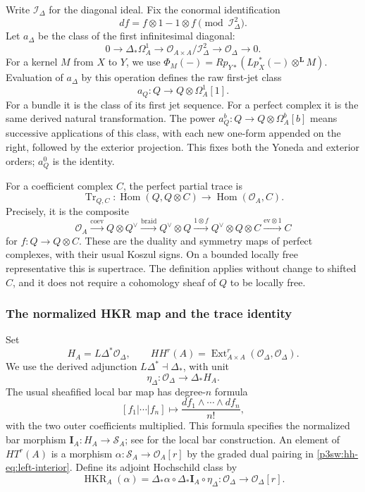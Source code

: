\documentclass[11pt]{article}
\numberwithin{equation}{section}
\begin{document}
Write \(\mathcal I_\Delta\) for the diagonal ideal.  Fix the conormal
identification
\[
 df=f\otimes1-1\otimes f
        \pmod{\mathcal I_\Delta^2}.
\]
Let \(a_\Delta\) be the class of the first infinitesimal diagonal:
\begin{equation}
 0\longrightarrow\Delta_*\Omega_A^1
 \longrightarrow\mathcal O_{A\times A}/\mathcal I_\Delta^2
 \longrightarrow\mathcal O_\Delta\longrightarrow0.
\label{p3sw:hh-eq:jet-extension}
\end{equation}
For a kernel \(M\) from \(X\) to \(Y\), we use
\(\Phi_M(-)=Rp_{Y*}(Lp_X^*(-)\otimes^{\mathbf L}M)\).
Evaluation of \(a_\Delta\) by this operation defines the raw
first-jet class
\[
 a_Q:Q\longrightarrow Q\otimes\Omega_A^1[1].
\]
For a bundle it is the class of its first jet sequence.  For a perfect
complex it is the same derived natural transformation.  The power
\(a_Q^b:Q\to Q\otimes\Omega_A^b[b]\) means successive applications
of this class, with each new one-form appended on the right, followed
by the exterior projection.  This fixes both the Yoneda and exterior
orders; \(a_Q^0\) is the identity.

For a coefficient complex \(C\), the perfect partial trace is
\[
 \operatorname{Tr}_{Q,C}:
 \operatorname{Hom}(Q,Q\otimes C)
       \longrightarrow\operatorname{Hom}(\mathcal O_A,C).
\]
Precisely, it is the composite
\[
 \mathcal O_A\xrightarrow{\mathrm{coev}}Q\otimes Q^\vee
 \xrightarrow{\mathrm{braid}}Q^\vee\otimes Q
 \xrightarrow{1\otimes f}Q^\vee\otimes Q\otimes C
 \xrightarrow{\mathrm{ev}\otimes1}C
\]
for \(f:Q\to Q\otimes C\).  These are the duality and symmetry maps
of perfect complexes, with their usual Koszul signs.  On a bounded
locally free representative this is supertrace.  The definition
applies without change to shifted \(C\), and it does not require a
cohomology sheaf of \(Q\) to be locally free.

\subsubsection{The normalized HKR map and the trace identity}

Set
\[
 H_A=L\Delta^*\mathcal O_\Delta,\qquad
 HH^r(A)=\operatorname{Ext}^r_{A\times A}
                   (\mathcal O_\Delta,\mathcal O_\Delta).
\]
We use the derived adjunction \(L\Delta^*\dashv\Delta_*\), with unit
\[
 \eta_\Delta:\mathcal O_\Delta\longrightarrow\Delta_*H_A.
\]
The usual sheafified local bar map has degree-\(n\) formula
\[
 [f_1|\cdots|f_n]\longmapsto
       \frac{df_1\wedge\cdots\wedge df_n}{n!},
\]
with the two outer coefficients multiplied.  This formula specifies
the normalized bar morphism
\(\mathbf I_A:H_A\to\mathcal S_A\); see
\cite[Section~4 and Corollary~4.2]{P3HHCaldararuII} for the local bar
construction.  An element of \(HT^r(A)\) is a morphism
\(\alpha:\mathcal S_A\to\mathcal O_A[r]\) by the graded dual pairing
in \eqref{p3sw:hh-eq:left-interior}.  Define its adjoint Hochschild
class by
\begin{equation}
 \operatorname{HKR}_A(\alpha)
  =\Delta_*\alpha\circ\Delta_*\mathbf I_A\circ\eta_\Delta:
       \mathcal O_\Delta\longrightarrow\mathcal O_\Delta[r].
\label{p3sw:hh-eq:adjoint-hkr}
\end{equation}
\end{document}
